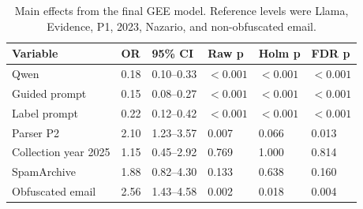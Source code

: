 \begin{table}[t]
\caption{Main effects from the final GEE model. Reference levels were Llama, Evidence, P1, 2023, Nazario, and non-obfuscated email.}
\label{tab:gee_main}
\begin{tabular}{llllll}
\toprule
Variable & OR & 95\% CI & Raw p & Holm p & FDR p \\
\midrule
Qwen & 0.18 & 0.10--0.33 & $<0.001$ & $<0.001$ & $<0.001$ \\
Guided prompt & 0.15 & 0.08--0.27 & $<0.001$ & $<0.001$ & $<0.001$ \\
Label prompt & 0.22 & 0.12--0.42 & $<0.001$ & $<0.001$ & $<0.001$ \\
Parser P2 & 2.10 & 1.23--3.57 & 0.007 & 0.066 & 0.013 \\
Collection year 2025 & 1.15 & 0.45--2.92 & 0.769 & 1.000 & 0.814 \\
SpamArchive & 1.88 & 0.82--4.30 & 0.133 & 0.638 & 0.160 \\
Obfuscated email & 2.56 & 1.43--4.58 & 0.002 & 0.018 & 0.004 \\
\bottomrule
\end{tabular}
\end{table}
